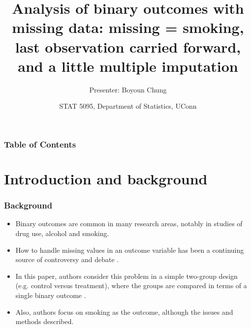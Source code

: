 \documentclass{beamer}
\title[Analysis of binary outcomes]{Analysis of binary outcomes with missing data: missing = smoking, last observation carried forward, and a little multiple imputation}
\author{Presenter: Boyoun Chung}
\institute{Authors: Donald Hedeker, Robin J. Mermelstein, Hakan Demirtas}
\date[STAT 5095]{STAT 5095, Department of Statistics, UConn}
\begin{document}
\footnotesize
\maketitle
\begin{frame}
\frametitle{Table of Contents}
\tableofcontents
\end{frame}
\section{Introduction and background}
\begin{frame}
\frametitle{Background}
\begin{itemize}
\item Binary outcomes are common in many research areas, notably in studies of drug use, alcohol and smoking. 
\vspace{10pt}
\item How to handle missing values in an outcome variable has been a continuing source of controversy and debate \citep{schafer2002missing}. 
\vspace{10pt}
\item In this paper, authors consider this problem in a simple two-group design (e.g. control versus treatment), where the groups are compared in terms of a single binary outcome \citep{hedeker2007analysis}. 
\vspace{10pt}
\item Also, authors focus on smoking as the outcome, although the issues and methods described.
\end{itemize}
\end{frame}
\end{document}
